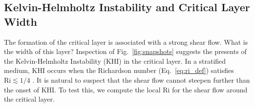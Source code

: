 \documentclass[
        fleqn,
        usenatbib,
        referee,
    ]{mnras}
\begin{document}
\subsection{Kelvin-Helmholtz Instability and Critical Layer Width}\label{ss:khi}

The formation of the critical layer is associated with a strong shear flow. What
is the width of this layer? Inspection of Fig.~\ref{fig:snapshots} suggests the
presents of the Kelvin-Helmholtz Instability (KHI) in the critical layer. In a
stratified medium, KHI occurs when the Richardson number (Eq.~\eqref{eq:ri_def})
satisfies $\mathrm{Ri} \lesssim 1/4$ \citep[e.g.][]{shu1991physics}. It is
natural to suspect that the shear flow cannot steepen further than the onset of
KHI\@. To test this, we compute the local $\mathrm{Ri}$ for the shear flow
around the critical layer.
\end{document}
